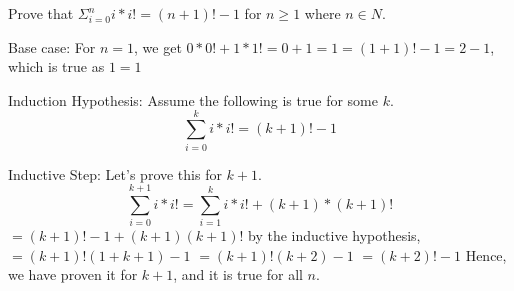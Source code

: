 \question Prove that $\Sigma_{i=0}^{n} i*i! = (n+1)! - 1$  for 
$n \geq 1$ where $n \in N$.
\begin{solution}[3in]
Base case: For $n = 1$, we get 
$0 * 0! + 1 * 1! = 0 + 1 = 1 = (1 + 1)! - 1 = 2 - 1$, which is true 
as $1 = 1$ \newline

Induction Hypothesis: Assume the following is true for some $k$. 
\[\sum_{i=0}^{k} i*i! = (k+1)! - 1\] \newline

Inductive Step: Let's prove this for  $k + 1$.
\[\sum_{i = 0}^{k + 1} i * i!= \sum_{i = 1}^k i * i!  + (k + 1) * (k + 1)!\]
\tab \tab \tab \tab$= (k + 1)! - 1 + (k+1)(k+1)!$ by the inductive hypothesis, \newline
\tab \tab \tab \tab$ = (k + 1)!(1 + k + 1) - 1$ \newline
\tab \tab \tab \tab$ = (k + 1)!(k + 2) - 1$ \newline
\tab \tab \tab \tab$ = (k + 2)! - 1$\newline
Hence, we have proven it for $k+1$, and it is true for all $n$.
\end{solution}

\clearpage